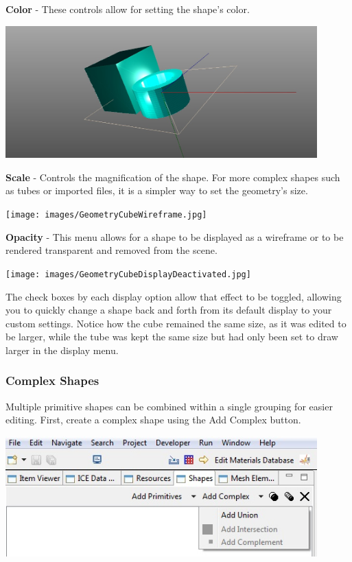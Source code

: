\textbf{Color} - These controls allow for setting the shape's color.

\begin{center}
\includegraphics[width=12cm]{images/GeometryCubeScale.jpg}
\end{center}

\textbf{Scale} - Controls the magnification of the shape. For more complex
shapes such as tubes or imported files, it is a simpler way to set the
geometry's size.

\begin{center}
\texttt{[image: images/GeometryCubeWireframe.jpg]}
\end{center}

\textbf{Opacity} - This menu allows for a shape to be displayed as a wireframe
or to be rendered transparent and removed from the scene.

\begin{center}
\texttt{[image: images/GeometryCubeDisplayDeactivated.jpg]}
\end{center}

The check boxes by each display option allow that effect to be toggled, allowing
you to quickly change a shape back and forth from its default display to your
custom settings. Notice how the cube remained the same size, as it was edited to
be larger, while the tube was kept the same size but had only been set to draw
larger in the display menu.

\subsubsection{Complex Shapes}

Multiple primitive shapes can be combined within a single grouping for easier
editing. First, create a complex shape using the Add Complex button. 

\begin{center}
\includegraphics[width=12cm]{images/GeometryAddComplex.jpg}
\end{center}

